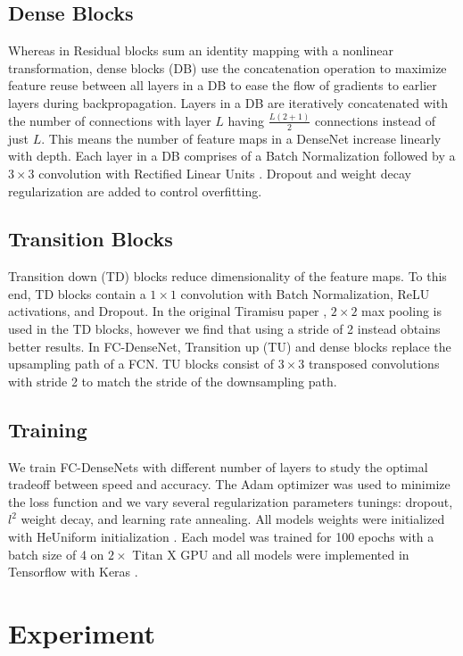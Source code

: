 \documentclass{llncs}
\begin{document}
\subsection{Dense Blocks}
Whereas in Residual blocks \cite{ResNet} sum an identity mapping with a nonlinear transformation, dense blocks (DB) use the concatenation operation to maximize feature reuse between all layers in a DB to ease the flow of gradients to earlier layers during backpropagation. Layers in a DB are iteratively concatenated with the number of connections with layer $L$ having  $\frac{L\left(2+1\right)}{2}$ connections instead of just $L$. This means the number of feature maps in a DenseNet increase linearly with depth. Each layer in a DB comprises of a Batch Normalization \cite{Batchnorm} followed by a $3 \times 3$ convolution with Rectified Linear Units \cite{ReLU}. Dropout \cite{Dropout} and weight decay regularization are added to control overfitting.  

\subsection{Transition Blocks}
Transition down (TD) blocks reduce dimensionality of the feature maps. To this end, TD blocks contain a $ 1 \times 1$ convolution with Batch Normalization, ReLU activations, and Dropout. In the original Tiramisu paper \cite{Tiramisu}, $2 \times 2$ max pooling is used in the TD blocks, however we find that using a stride of 2 instead obtains better results. In FC-DenseNet, Transition up (TU) and dense blocks replace the upsampling path of a FCN. TU blocks consist of $3 \times 3$ transposed convolutions with stride 2 to match the stride of the downsampling path.   

\subsection{Training}
We train FC-DenseNets with different number of layers to study the optimal tradeoff between speed and accuracy. The Adam \cite{Adam} optimizer was used to minimize the loss function and we vary several regularization parameters tunings: dropout, $l^2$ weight decay, and learning rate annealing. All models weights were initialized with HeUniform initialization \cite {ReLU}. Each model was trained for 100 epochs with a batch size of 4 on $2  \times$ Titan X GPU and all models were implemented in Tensorflow with Keras \cite{TensorFlow,Keras}.


\section{Experiment}
\end{document}
